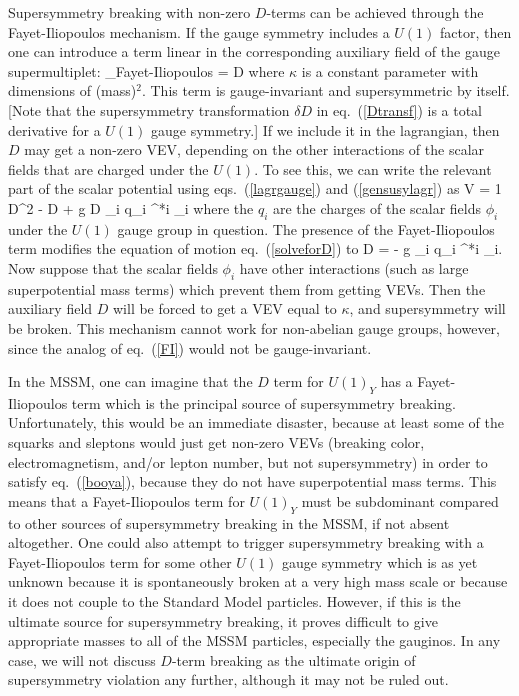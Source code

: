 Supersymmetry breaking with non-zero $D$-terms can be achieved through
the Fayet-Iliopoulos mechanism.\cite{FayetIliopoulos} 
If the gauge symmetry includes a $U(1)$ factor, then one can introduce
a term linear in the corresponding auxiliary
field of the gauge supermultiplet:
\beq
\lagr_{\rm Fayet-Iliopoulos}
= \kappa D
\label{FI}
\eeq
where $\kappa$ is a constant parameter with dimensions of (mass)$^2$.
This
term is gauge-invariant and supersymmetric by itself.
[Note that the supersymmetry transformation $\delta D$
in eq.~(\ref{Dtransf})
is a total derivative
for a $U(1)$ gauge symmetry.]
If we include it in the lagrangian, then $D$ may get a non-zero
VEV, depending on the other interactions of the scalar fields
that are charged under the $U(1)$. To see
this, we can write the
relevant part of the scalar potential
using eqs.~(\ref{lagrgauge}) and (\ref{gensusylagr})
as
\beq
V = {1} D^2 - \kappa D + g D \sum_i q_i \phi^{*i} \phi_i
\eeq
where the $q_i$ are the charges of the scalar fields $\phi_i$
under the $U(1)$ gauge group in question.
The presence of the Fayet-Iliopoulos term %
modifies the
equation of motion eq.~(\ref{solveforD}) to
\beq
D = \kappa - g \sum_i q_i \phi^{*i} \phi_i.
\label{booya}
\eeq
Now suppose that the
scalar fields $\phi_i$ have other interactions (such as large
superpotential mass terms) which prevent them from getting VEVs.
Then the auxiliary field $D$ will be forced to get a VEV equal to
$\kappa$,
and supersymmetry will be broken. This mechanism cannot work
for non-abelian gauge groups, however, since the analog of eq.~(\ref{FI})
would not be
gauge-invariant.

In the MSSM, one can imagine that the $D$ term for $U(1)_Y$ has
a Fayet-Iliopoulos term which is the principal source of
supersymmetry breaking.
Unfortunately, this would be an immediate
disaster, because at least some of the squarks and sleptons
would just get non-zero VEVs (breaking color, electromagnetism, and/or
lepton number, but not supersymmetry) in order to satisfy
eq.~(\ref{booya}),
because they do not have superpotential mass terms. This means that
a Fayet-Iliopoulos term for $U(1)_Y$ must be subdominant
compared to other sources of supersymmetry breaking in the MSSM,
if not absent altogether. One could also attempt to trigger
supersymmetry breaking with a Fayet-Iliopoulos term for some other $U(1)$
gauge symmetry which is as yet unknown because it is spontaneously
broken at a very high mass scale or because it does not couple to
the Standard Model particles. However, if this is the ultimate source
for supersymmetry breaking, it
proves difficult to give appropriate masses to all of the MSSM particles,
especially the gauginos. In any case, we will not discuss $D$-term
breaking as the ultimate origin of supersymmetry violation
any further, although it may not be ruled out.\cite{dtermbreakingmaywork}

